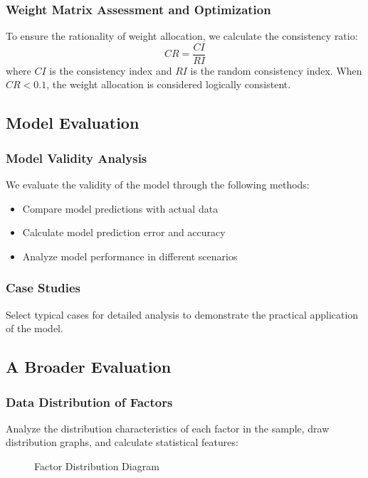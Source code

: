 \documentclass[12pt,a4paper]{article}
\begin{document}
\subsubsection{Weight Matrix Assessment and Optimization}
To ensure the rationality of weight allocation, we calculate the consistency ratio:
\begin{equation}
CR = \frac{CI}{RI}
\end{equation}
where $CI$ is the consistency index and $RI$ is the random consistency index. When $CR < 0.1$, the weight allocation is considered logically consistent.

\subsection{Model Evaluation}
\subsubsection{Model Validity Analysis}
We evaluate the validity of the model through the following methods:
\begin{itemize}
  \item Compare model predictions with actual data
  \item Calculate model prediction error and accuracy
  \item Analyze model performance in different scenarios
\end{itemize}

\subsubsection{Case Studies}
Select typical cases for detailed analysis to demonstrate the practical application of the model.

\subsection{A Broader Evaluation}
\subsubsection{Data Distribution of Factors}
Analyze the distribution characteristics of each factor in the sample, draw distribution graphs, and calculate statistical features:
\begin{figure}[htbp]
  \centering
  \caption{Factor Distribution Diagram}
  \label{fig:factor_distribution}
\end{figure}
\end{document}
